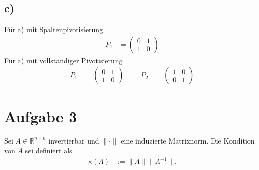 \documentclass[english, parskip=full]{scrartcl}
\begin{document}
\subsection*{c)}
Für a) mit Spaltenpivotisierung
\begin{align}
P_1 &= \begin{pmatrix}
0 & 1 \\ 1 & 0
\end{pmatrix}
\end{align}
Für a) mit vollständiger Pivotisierung
\begin{align}
P_1 &= \begin{pmatrix}
0 & 1 \\ 1 & 0
\end{pmatrix}&&&P_2 &= \begin{pmatrix}
1 & 0 \\ 0 & 1
\end{pmatrix}
\end{align}

\newpage
\section*{Aufgabe 3}
Sei $A\in\mathbb{R}^{n\times n}$ invertierbar und $\|\cdot\|$ eine induzierte Matrixnorm. 
Die Kondition von $A$ sei definiert als
\begin{align}
\kappa(A) &:= \|A\|\|A^{-1}\|.
\end{align}
\end{document}
